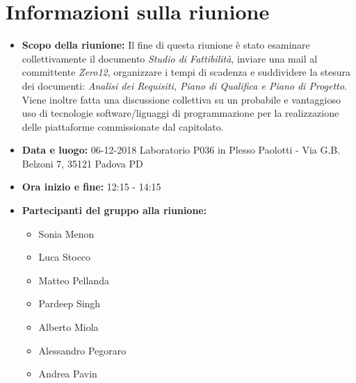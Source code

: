 \clearpage
\section{Informazioni sulla riunione}
\begin{itemize}
	\item \textbf {Scopo della riunione:} Il fine di questa riunione è stato esaminare collettivamente il documento \emph{Studio di Fattibilità}, inviare una mail al committente \emph{Zero12}, organizzare i tempi di scadenza e suddividere la stesura dei documenti: \emph{Analisi dei Requisiti, Piano di Qualifica e Piano di Progetto}. \\
	Viene inoltre fatta una discussione collettiva su un probabile e vantaggioso uso di tecnologie software/liguaggi di programmazione per la realizzazione delle piattaforme commissionate dal capitolato.
	
	\item \textbf {Data e luogo:} 06-12-2018 Laboratorio P036 in Plesso Paolotti - Via G.B. Belzoni 7, 35121 Padova PD
	
	\item \textbf {Ora inizio e fine:} 12:15 - 14:15
	
	\item \textbf {Partecipanti del gruppo alla riunione:} 
		 \begin{itemize}
			\item Sonia Menon
			\item Luca Stocco
			\item Matteo Pellanda
			\item Pardeep Singh
			\item Alberto Miola
			\item Alessandro Pegoraro
			\item Andrea Pavin
		\end{itemize}
\end{itemize}